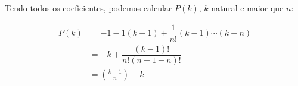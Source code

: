 \documentclass{article}
\begin{document}
\begin{enumerate}
            Tendo todos os coeficientes, podemos calcular $P(k)$, $k$ natural e maior que $n$:

            \begin{align*}
                P(k) &= -1-1(k-1)+\dfrac{1}{n!}(k-1)\cdots(k-n) \\
                &= -k + \dfrac{(k-1)!}{n!(n-1-n)!} \\
                &= {k-1\choose n} - k
            \end{align*}

    \end{enumerate}
\end{document}
